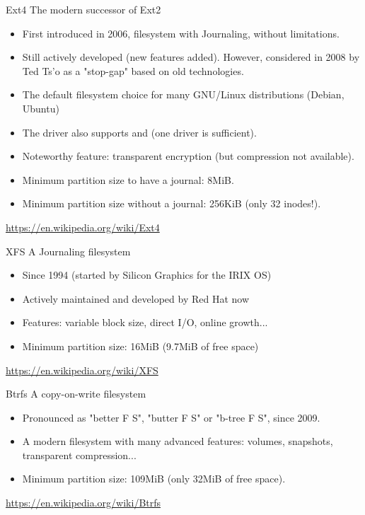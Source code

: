 \begin{frame}{Ext4}
    The modern successor of Ext2
    \begin{itemize}
        \item First introduced in 2006, filesystem with Journaling, without  limitations.
        \item Still actively developed (new features added). However, considered in 2008
              by Ted Ts'o as a "stop-gap" based on old technologies.
        \item The default filesystem choice for many GNU/Linux distributions (Debian, Ubuntu)
        \item The  driver also supports  and  (one driver is sufficient).
        \item Noteworthy feature: transparent encryption (but compression not available).
        \item Minimum partition size to have a journal: 8MiB.
        \item Minimum partition size without a journal: 256KiB (only 32 inodes!).
    \end{itemize}
    \url{https://en.wikipedia.org/wiki/Ext4}
\end{frame}

\begin{frame}{XFS}
    A Journaling filesystem
    \begin{itemize}
        \item Since 1994 (started by Silicon Graphics for the IRIX OS)
        \item Actively maintained and developed by Red Hat now
        \item Features: variable block size, direct I/O, online growth...
        \item Minimum partition size: 16MiB (9.7MiB of free space)
    \end{itemize}
    \url{https://en.wikipedia.org/wiki/XFS}
\end{frame}

\begin{frame}{Btrfs}
    A copy-on-write filesystem
    \begin{itemize}
        \item Pronounced as "better F S", "butter F S" or "b-tree F S", since 2009.
        \item A modern filesystem with many advanced features: volumes, snapshots, transparent compression...
        \item Minimum partition size: 109MiB (only 32MiB of free space).
    \end{itemize}
    \url{https://en.wikipedia.org/wiki/Btrfs}
\end{frame}

